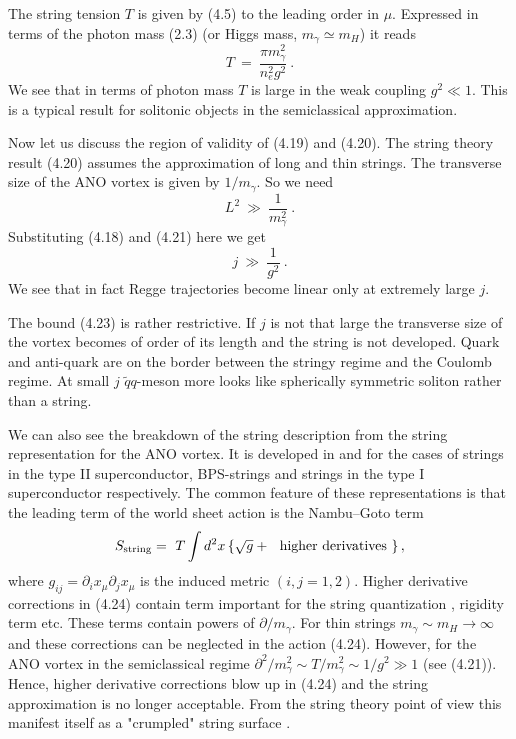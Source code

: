 \documentclass[a4paper,12pt]{article}
\begin{document}
 The
string tension $T$ is given by (4.5) to the leading order in
$\mu $. Expressed in terms of the photon mass (2.3) (or
Higgs mass, $m_\gamma\simeq m_H$) it reads
\begin{equation}
T\ =\ \frac{\pi m^2_\gamma}{n^2_eg^2}\ .
\end{equation}
We see that in terms of photon mass $T$ is large in the weak coupling
 $g^2\ll 1$. This is a typical result for solitonic objects
in the semiclassical approximation.

Now let us discuss the region of validity of (4.19) and (4.20).
The string theory result (4.20) assumes the approximation of long
and thin strings. The transverse size of the ANO vortex is given
by $1/m_\gamma$. So we need
\begin{equation}
L^2\ \gg\ \frac1{m^2_\gamma}\ .
\end{equation}
Substituting (4.18) and (4.21) here we get
\begin{equation}
j\ \gg\ \frac1{g^2}\ .
\end{equation}
We see that in fact Regge trajectories become linear only at
extremely large $j$.

The bound (4.23) is rather restrictive. If $j$ is not that large
the transverse size of the vortex becomes of  order of
its length and the string is not developed. Quark and anti-quark
are on the border between the stringy regime and the Coulomb
regime.
 At small $j$ $\tilde qq$-meson more looks like spherically
symmetric soliton  rather than a
string.

We can also see the breakdown of the string description from the
string representation for the ANO vortex. It is developed in
\cite{O,BS} and \cite{Y} for the cases of strings in the type II
superconductor, BPS-strings and strings in the type I
superconductor respectively. The common feature of these
representations is that the leading term of the world sheet
action is the Nambu--Goto term
\begin{equation}
S_{\rm string}=\ T\int d^2x\left\{\sqrt g+\ \mbox{ higher
derivatives }\right\},
\end{equation}
where $g_{ij}=\partial_ix_\mu\partial_jx_\mu$ is the induced metric
$(i,j=1,2)$. Higher derivative corrections in (4.24) contain
term important for the string quantization \cite{PS,ACPZ},
rigidity term \cite{P} etc. These terms contain  powers of
$\partial/m_\gamma$. For thin strings $m_\gamma\sim
m_H\to\infty$ and these corrections can be neglected in the action (4.24).
However, for the ANO vortex in the semiclassical regime
$\partial^2/m^2_\gamma\sim T/m^2_\gamma\sim1/g^2\gg1$ (see
(4.21)). Hence, higher derivative corrections blow up in (4.24)
and the string approximation is no longer acceptable. From the
string theory point of view this manifest itself as a "crumpled"
string surface \cite{P,D}.
\end{document}
